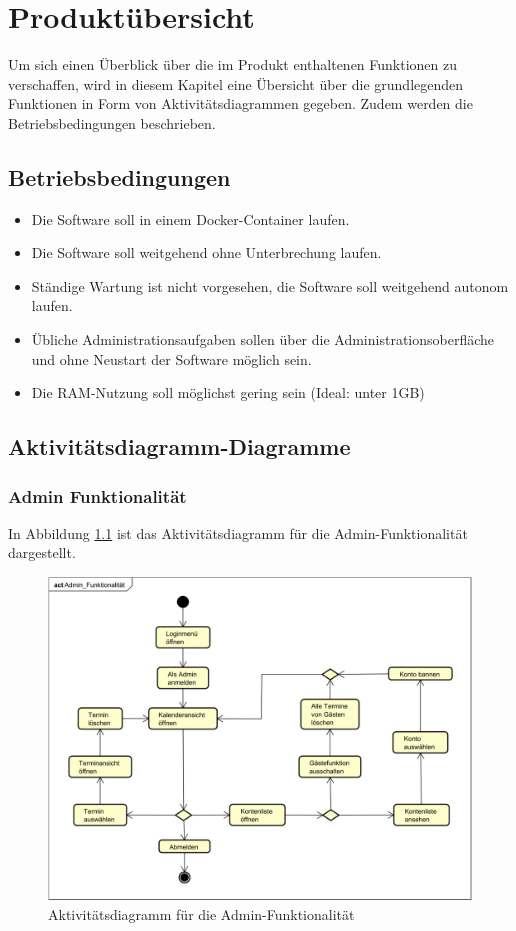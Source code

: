 
\chapter{Produktübersicht}
\label{chap:product_overview}
Um sich einen Überblick über die im Produkt enthaltenen Funktionen zu verschaffen, wird in diesem Kapitel eine Übersicht über die grundlegenden Funktionen in Form von Aktivitätsdiagrammen gegeben.
Zudem werden die Betriebsbedingungen beschrieben.
\section{Betriebsbedingungen}
\begin{itemize}
    \item Die Software soll in einem \gls{Docker}-\gls{Container} laufen.
    \item Die Software soll weitgehend ohne Unterbrechung laufen.
    \item Ständige Wartung ist nicht vorgesehen, die Software soll weitgehend autonom laufen.
    \item Übliche Administrationsaufgaben sollen über die Administrationsoberfläche und ohne Neustart der Software möglich sein.
    \item Die \gls{RAM}-Nutzung soll möglichst gering sein (Ideal: unter 1GB)
\end{itemize}

\newpage
\section{Aktivitätsdiagramm-Diagramme}

\subsection{Admin Funktionalität}
In Abbildung \ref{fig:activity_diagram_admin} ist das Aktivitätsdiagramm für die Admin-Funktionalität dargestellt.
\begin{figure}[ht]
    \centering
    \includegraphics[width=\textwidth]{figures/activitydiagrams/adminfunk}
    \caption{Aktivitätsdiagramm für die Admin-Funktionalität}
    \label{fig:activity_diagram_admin}
\end{figure}
\clearpage
